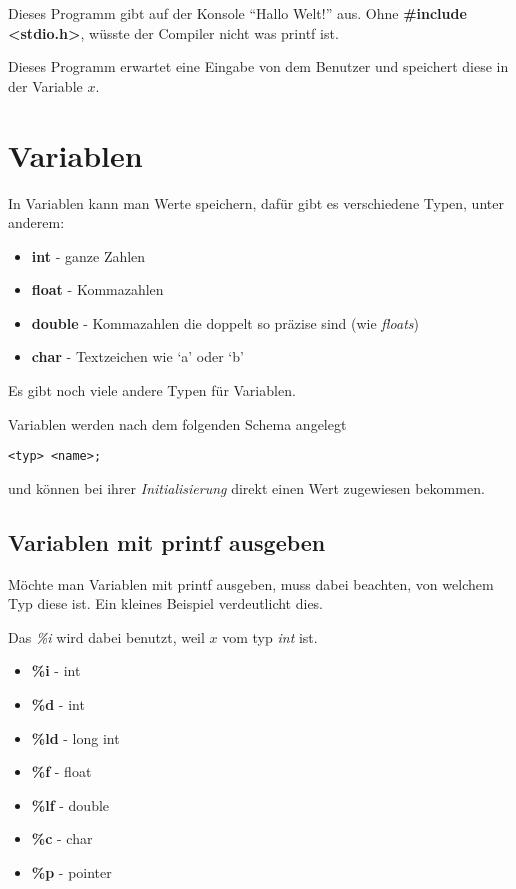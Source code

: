 \documentclass[c_worksheet.tex]{subfiles}
\begin{document}
Dieses Programm gibt auf der Konsole ``Hallo Welt!'' aus. Ohne \textbf{\#include <stdio.h>}, wüsste der Compiler nicht was printf ist.



Dieses Programm erwartet eine Eingabe von dem Benutzer und speichert diese in der Variable \(x\). 

\section{Variablen}

In Variablen kann man Werte speichern, dafür gibt es verschiedene Typen, unter anderem:

\begin{itemize}
 	\item \textbf{int} - ganze Zahlen
 	\item \textbf{float} - Kommazahlen
 	\item \textbf{double} - Kommazahlen die doppelt so präzise sind (wie \emph{floats})
 	\item \textbf{char} - Textzeichen wie `a' oder `b' 
 \end{itemize} 

Es gibt noch viele andere Typen für Variablen.

Variablen werden nach dem folgenden Schema angelegt

\begin{lstlisting}[numbers=none]
<typ> <name>;
\end{lstlisting}

und können bei ihrer \emph{Initialisierung} direkt einen Wert zugewiesen bekommen.

 

\subsection{Variablen mit printf ausgeben} 

Möchte man Variablen mit printf ausgeben, muss dabei beachten, von welchem Typ diese ist. Ein kleines Beispiel verdeutlicht dies.



Das \emph{\%i} wird dabei benutzt, weil \(x\) vom typ \emph{int} ist.

\begin{itemize}
	\item \textbf{\%i} - int
	\item \textbf{\%d} - int
	\item \textbf{\%ld} - long int
	\item \textbf{\%f} - float
	\item \textbf{\%lf} - double
	\item \textbf{\%c} - char
	\item \textbf{\%p} - pointer 
\end{itemize}
\end{document}

